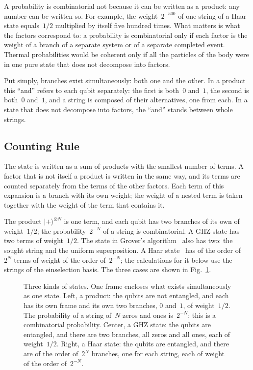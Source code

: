 \documentclass[11pt,a4paper]{article}
\begin{document}
A probability is combinatorial not because it can be written as a product: any number can be written so. For example, the weight~$2^{-500}$ of one string of a Haar state equals~$1/2$ multiplied by itself five hundred times. What matters is what the factors correspond to: a probability is combinatorial only if each factor is the weight of a branch of a separate system or of a separate completed event. Thermal probabilities would be coherent only if all the particles of the body were in one pure state that does not decompose into factors.

Put simply, branches exist simultaneously: both one and the other. In a product this ``and'' refers to each qubit separately: the first is both~$0$ and~$1$, the second is both~$0$ and~$1$, and a string is composed of their alternatives, one from each. In a state that does not decompose into factors, the ``and'' stands between whole strings.

\subsection{Counting Rule}
\label{sec:counting}

The state is written as a sum of products with the smallest number of terms. A factor that is not itself a product is written in the same way, and its terms are counted separately from the terms of the other factors. Each term of this expansion is a branch with its own weight; the weight of a nested term is taken together with the weight of the term that contains it.

The product $|+\rangle^{\otimes N}$ is one term, and each qubit has two branches of its own of weight~$1/2$; the probability~$2^{-N}$ of a string is combinatorial. A GHZ state has two terms of weight~$1/2$. The state in Grover's algorithm~\cite{grover1996} also has two: the sought string and the uniform superposition. A Haar state~\cite{page1993} has of the order of~$2^N$ terms of weight of the order of~$2^{-N}$; the calculations for it below use the strings of the einselection basis. The three cases are shown in Fig.~\ref{fig:systems}.

\begin{figure}[ht]
\centering

\caption{Three kinds of states. One frame encloses what exists simultaneously as one state. Left, a product: the qubits are not entangled, and each has its own frame and its own two branches, $0$ and~$1$, of weight~$1/2$. The probability of a string of~$N$ zeros and ones is~$2^{-N}$; this is a combinatorial probability. Center, a GHZ state: the qubits are entangled, and there are two branches, all zeros and all ones, each of weight~$1/2$. Right, a Haar state: the qubits are entangled, and there are of the order of~$2^N$ branches, one for each string, each of weight of the order of~$2^{-N}$.}
\label{fig:systems}
\end{figure}
\end{document}
